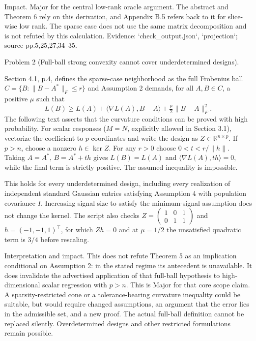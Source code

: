 \documentclass[10pt]{article}
\begin{document}
Impact. Major for the central low-rank oracle argument. The abstract and Theorem 6 rely on this derivation, and Appendix B.5 refers back to it for slice-wise low rank. The sparse case does not use the same matrix decomposition and is not refuted by this calculation. Evidence: `check\_output.json`, `projection`; source pp.5,25,27,34–35.\par
Problem 2 (Full-ball strong convexity cannot cover underdetermined designs).\par
Section 4.1, p.4, defines the sparse-case neighborhood as the full Frobenius ball \(C=\{B:\|B-A^*\|_F\le r\}\) and Assumption 2 demands, for all \(A,B\in C\), a positive \(\mu\) such that \[L(B)\ge L(A)+\langle\nabla L(A),B-A\rangle+\tfrac\mu2\|B-A\|_F^2.\] The following text asserts that the curvature conditions can be proved with high probability. For scalar responses (\(M=N\), explicitly allowed in Section 3.1), vectorize the coefficient to \(p\) coordinates and write the design as \(Z\in\mathbb R^{n\times p}\). If \(p>n\), choose a nonzero \(h\in\ker Z\). For any \(r>0\) choose \(0<t<r/\|h\|\). Taking \(A=A^*\), \(B=A^*+th\) gives \(L(B)=L(A)\) and \(\langle\nabla L(A),th\rangle=0\), while the final term is strictly positive. The assumed inequality is impossible.\par
This holds for every underdetermined design, including every realization of independent standard Gaussian entries satisfying Assumption 4 with population covariance \(I\). Increasing signal size to satisfy the minimum-signal assumption does not change the kernel. The script also checks \(Z=\left(\begin{smallmatrix}1&0&1\\0&1&1\end{smallmatrix}\right)\) and \(h=(-1,-1,1)^\top\), for which \(Zh=0\) and at \(\mu=1/2\) the unsatisfied quadratic term is \(3/4\) before rescaling.\par
Interpretation and impact. This does not refute Theorem 5 as an implication conditional on Assumption 2: in the stated regime its antecedent is unavailable. It does invalidate the advertised application of that full-ball hypothesis to high-dimensional scalar regression with \(p>n\). This is Major for that core scope claim. A sparsity-restricted cone or a tolerance-bearing curvature inequality could be suitable, but would require changed assumptions, an argument that the error lies in the admissible set, and a new proof. The actual full-ball definition cannot be replaced silently. Overdetermined designs and other restricted formulations remain possible.\par
\end{document}
